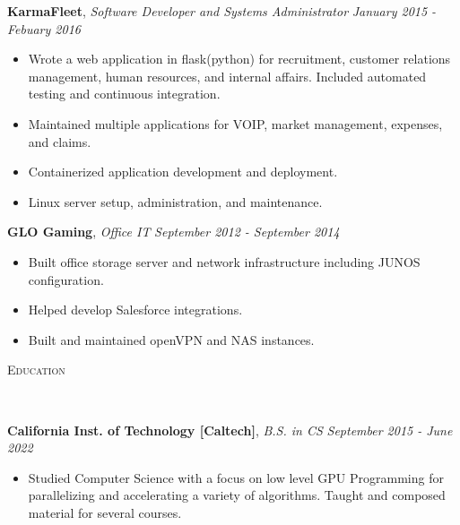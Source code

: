 \documentclass[9pt]{article}
\newenvironment{changemargin}[2]{%
  \begin{list}{}{%
    \setlength{\topsep}{0pt}%
    \setlength{\leftmargin}{#1}%
    \setlength{\rightmargin}{#2}%
    \setlength{\listparindent}{\parindent}%
    \setlength{\itemindent}{\parindent}%
    \setlength{\parsep}{\parskip}%
  }%
  \item[]}{\end{list}
}
\newcommand{\lineover}{
	\begin{changemargin}{-0.05in}{-0.05in}
		\vspace*{-8pt}
		\hrulefill \\
		\vspace*{-2pt}
	\end{changemargin}
}
\newcommand{\header}[1]{
	\begin{changemargin}{-0.5in}{-0.5in}
		\scshape{#1}\\
  	\lineover
	\end{changemargin}
}
\newenvironment{body} {
	\vspace*{-16pt}
	\begin{changemargin}{-0.25in}{-0.5in}
  }	
	{\end{changemargin}
}
\begin{document}
\begin{body}
	\textbf{KarmaFleet}, \emph{Software Developer and Systems Administrator} \hfill \emph{January 2015 - Febuary 2016}\\
	\vspace*{-3pt}
	\begin{itemize} \itemsep -0pt %
		\item Wrote a web application in flask(python) for recruitment, customer relations management, human resources, and internal affairs. Included automated testing and continuous integration.
		\item Maintained multiple applications for VOIP, market management, expenses, and claims.
		\item Containerized application development and deployment.
		\item Linux server setup, administration, and maintenance.
	\end{itemize}
	\vspace*{-2pt}

	\textbf{GLO Gaming}, \emph{Office IT} \hfill \emph{September 2012 - September 2014}\\
	\vspace*{-3pt}
	\begin{itemize} \itemsep -0pt %
		\item Built office storage server and network infrastructure including JUNOS configuration.
		\item Helped develop Salesforce integrations.
		\item Built and maintained openVPN and NAS instances.
	\end{itemize}
	\vspace*{-2pt}

	\smallskip
	\vspace*{-3pt}
	\vspace*{-5pt}
	\smallskip

	\header{Education}
	\begin{body}
		\vspace{16pt}
		\textbf{California Inst. of Technology [Caltech]}{}, \emph{B.S. in CS} \hfill \emph{September 2015 - June 2022}{} \\
		\vspace{-3pt}
		\begin{itemize} \itemsep -0pt
			\item Studied Computer Science with a focus on low level GPU Programming for
			parallelizing and accelerating a variety of algorithms. Taught and composed material for
			several courses.
		\end{itemize}
	\end{body}

	\smallskip
	\vspace*{-3pt}


\end{body}
\end{document}

